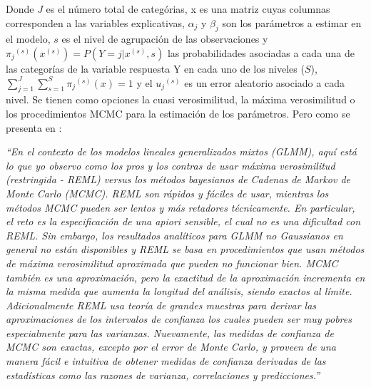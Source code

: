 \documentclass[]{article}
\theoremstyle{definition}
\theoremstyle{definition}
\theoremstyle{definition}
\theoremstyle{remark}
\begin{document}
Donde \(J\) es el número total de categórias, x es una matriz cuyas
columnas corresponden a las variables explicativas, \({ \alpha }_{ j }\)
y \({ \beta }_{ j }\) son los parámetros a estimar en el modelo, \(s\)
es el nivel de agrupación de las observaciones y
\({ { \pi }_{ j } }^{ (s) }({ x }^{ (s) })=P(Y=j|{ x }^{ (s) },s)\) las
probabilidades asociadas a cada una de las categorías de la variable
respuesta Y en cada uno de los niveles (\(S\)),
\(\sum _{ j=1 }^{ J }{ \sum _{ s=1 }^{ S }{ { { \pi }_{ j } }^{ (s) }(x) } } =1\)
y el \({ { u }_{ j } }^{ (s) }\) es un error aleatorio asociado a cada
nivel. Se tienen como opciones la cuasi verosimilitud, la máxima
verosimilitud o los procedimientos MCMC para la estimación de los
parámetros. Pero como se presenta en \citep{HadfieldBook}:

\emph{``En el contexto de los modelos lineales generalizados mixtos
(GLMM), aquí está lo que yo observo como los pros y los contras de usar
máxima verosimilitud (restringida - REML) versus los métodos bayesianos
de Cadenas de Markov de Monte Carlo (MCMC). REML son rápidos y fáciles
de usar, mientras los métodos MCMC pueden ser lentos y más retadores
técnicamente. En particular, el reto es la especificación de una apiori
sensible, el cual no es una dificultad con REML. Sin embargo, los
resultados analíticos para GLMM no Gaussianos en general no están
disponibles y REML se basa en procedimientos que usan métodos de máxima
verosimilitud aproximada que pueden no funcionar bien. MCMC también es
una aproximación, pero la exactitud de la aproximación incrementa en la
misma medida que aumenta la longitud del análisis, siendo exactos al
límite. Adicionalmente REML usa teoría de grandes muestras para derivar
las aproximaciones de los intervalos de confianza los cuales pueden ser
muy pobres especialmente para las varianzas. Nuevamente, las medidas de
confianza de MCMC son exactas, excepto por el error de Monte Carlo, y
proveen de una manera fácil e intuitiva de obtener medidas de confianza
derivadas de las estadísticas como las razones de varianza,
correlaciones y predicciones.''}
\end{document}
